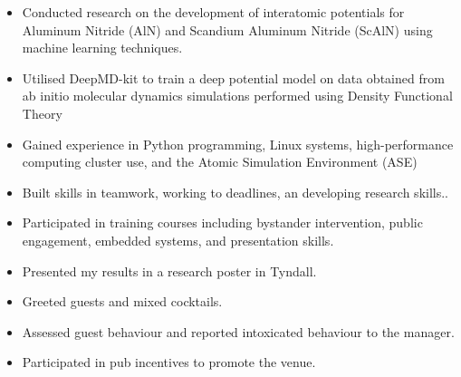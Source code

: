 \documentclass[10pt,a4paper]{altacv}
\begin{document}

\begin{fullwidth}
\makecvheader
\end{fullwidth}


\begin{itemize}
\item {Conducted research on the development of interatomic potentials for Aluminum Nitride (AlN) and Scandium Aluminum Nitride (ScAlN) using machine learning techniques.}
\item {Utilised DeepMD-kit to train a deep potential model on data obtained from ab initio molecular dynamics simulations performed using Density Functional Theory}
\item {Gained experience in Python programming, Linux systems, high-performance computing cluster use, and the Atomic Simulation Environment (ASE)}
\item {Built skills in teamwork, working to deadlines, an developing research skills.}.
\item{Participated in training courses including bystander intervention, public engagement, embedded systems, and presentation skills.}
\item {Presented my results in a research poster in Tyndall.}
\end{itemize}

\divider

\begin{itemize}
\item {Greeted guests and mixed cocktails.}
\item {Assessed guest behaviour and reported intoxicated behaviour to the manager.}
\item {Participated in pub incentives to promote the venue.}
\end{itemize}
\end{document}
